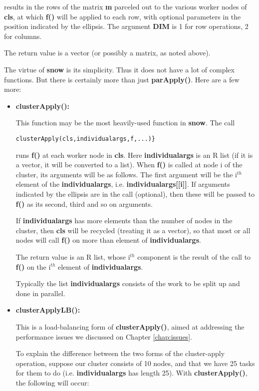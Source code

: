 results in the rows of the matrix {\bf m} parceled out to the various
worker nodes of {\bf cls}, at which {\bf f()} will be applied to each
row, with optional parameters in the position indicated by the ellipsis.
The argument {\bf DIM} is 1 for row operations, 2 for columns.

The return value is a vector (or possibly a matrix, as noted above).

The virtue of {\bf snow} is its simplicity.  Thus it does not have a lot
of complex functions.  But there is certainly more than just {\bf
parApply()}.  Here are a few more:

\begin{itemize}

\item {\bf clusterApply():}

This function may be the most heavily-used function in {\bf snow}.  The
call 

\begin{lstlisting}
clusterApply(cls,individualargs,f,...)}
\end{lstlisting}

runs {\bf f()} at each worker node in {\bf cls}.  Here {\bf
individualargs} is an R list (if it is a vector, it will be converted to
a list).  When {\bf f()} is called at node i of the cluster, its
arguments will be as follows.  The first argument will be the i$^{th}$
element of the {\bf individualargs}, i.e. {\bf individualargs[[i]]}.  If
arguments indicated by the ellipsis are in the call (optional), then
these will be passed to {\bf f()} as its second, third and so on
arguments.

If {\bf individualargs} has more elements than the number of nodes in
the cluster, then {\bf cls} will be recycled (treating it as a vector),
so that most or all nodes will call {\bf f()} on more than element of
{\bf individualargs}.

The return value is an R list, whose i$^{th}$ component is the result of
the call to {\bf f()} on the i$^{th}$ element of {\bf individualargs}.

Typically the list {\bf individualargs} consists of the work to be split
up and done in parallel.

\item {\bf clusterApplyLB():}

This is a load-balancing form of {\bf clusterApply()}, aimed at
addressing the performance issues we discussed on Chapter
\ref{chap:issues}.  

To explain the difference between the two forms of the cluster-apply
operation, suppose our cluster consists of 10 nodes, and that we have 25
tasks for them to do (i.e. {\bf individualargs} has length 25).  With
{\bf clusterApply()}, the following will occur:


\end{itemize}
